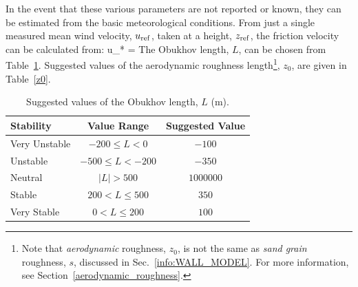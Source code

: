 \documentclass[11pt]{book}
\begin{document}
In the event that these various parameters are not reported or known, they can be estimated from the basic meteorological conditions. From just a single measured mean wind velocity, $u_{\rm ref}$, taken at a height, $z_{\rm ref}$, the friction velocity can be calculated from:
\be
   u_* = 
\ee
The Obukhov length, $L$, can be chosen from Table~\ref{OL}. Suggested values of the aerodynamic roughness length\footnote{Note that \emph{aerodynamic} roughness, $z_0$, is not the same as \emph{sand grain} roughness, $s$, discussed in Sec.~\ref{info:WALL_MODEL}. For more information, see Section~\ref{aerodynamic_roughness}.}, $z_0$, are given in Table~\ref{z0}.
\begin{table}[!ht]
\centering
\caption[Suggested values of Obukhov length]{Suggested values of the Obukhov length, $L$ (m).}
\begin{tabular}{|l|c|c|} \hline
Stability           & Value Range            & Suggested Value  \\  \hline \hline
Very Unstable       & $-200 \le L < 0$       & $-100$           \\ \hline
Unstable            & $-500 \le L < -200$    & $-350$           \\ \hline
Neutral             & $|L|>500$              & $1000000$        \\ \hline
Stable              & $200 < L \le 500$      & $350$            \\ \hline
Very Stable         & $0 < L \le 200$        & $100$            \\ \hline
\end{tabular}
\label{OL}
\end{table}
\end{document}
